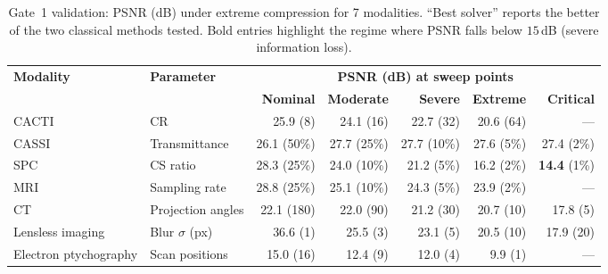 \documentclass[11pt]{article}
\begin{document}
\begin{table}[htbp]
\centering
\caption{Gate~1 validation: PSNR (dB) under extreme compression for 7
modalities.  ``Best solver'' reports the better of the two classical
methods tested.  Bold entries highlight the regime where PSNR falls
below $15$\,dB (severe information loss).}
\label{tab:gate1}
\small
\begin{tabular}{l l r r r r r}
\toprule
\textbf{Modality} & \textbf{Parameter} &
  \multicolumn{5}{c}{\textbf{PSNR (dB) at sweep points}} \\
\cmidrule(lr){3-7}
 & & \textbf{Nominal} & \textbf{Moderate} & \textbf{Severe} & \textbf{Extreme} & \textbf{Critical} \\
\midrule
CACTI & CR
  & 25.9 \scriptsize{(8)} & 24.1 \scriptsize{(16)} & 22.7 \scriptsize{(32)} & 20.6 \scriptsize{(64)} & --- \\
CASSI & Transmittance
  & 26.1 \scriptsize{(50\%)} & 27.7 \scriptsize{(25\%)} & 27.7 \scriptsize{(10\%)} & 27.6 \scriptsize{(5\%)} & 27.4 \scriptsize{(2\%)} \\
SPC & CS ratio
  & 28.3 \scriptsize{(25\%)} & 24.0 \scriptsize{(10\%)} & 21.2 \scriptsize{(5\%)} & 16.2 \scriptsize{(2\%)} & \textbf{14.4} \scriptsize{(1\%)} \\
MRI & Sampling rate
  & 28.8 \scriptsize{(25\%)} & 25.1 \scriptsize{(10\%)} & 24.3 \scriptsize{(5\%)} & 23.9 \scriptsize{(2\%)} & --- \\
CT & Projection angles
  & 22.1 \scriptsize{(180)} & 22.0 \scriptsize{(90)} & 21.2 \scriptsize{(30)} & 20.7 \scriptsize{(10)} & 17.8 \scriptsize{(5)} \\
Lensless imaging & Blur $\sigma$ (px)
  & 36.6 \scriptsize{(1)} & 25.5 \scriptsize{(3)} & 23.1 \scriptsize{(5)} & 20.5 \scriptsize{(10)} & 17.9 \scriptsize{(20)} \\
Electron ptychography & Scan positions
  & 15.0 \scriptsize{(16)} & 12.4 \scriptsize{(9)} & 12.0 \scriptsize{(4)} & 9.9 \scriptsize{(1)} & --- \\
\bottomrule
\end{tabular}
\end{table}
\end{document}
